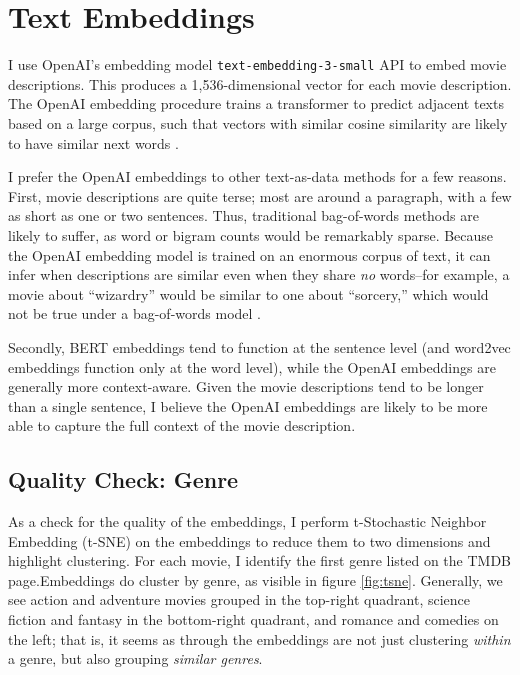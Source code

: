 \documentclass{article}
\begin{document}
\section{Text Embeddings}

I use OpenAI's embedding model \texttt{text-embedding-3-small} API to embed movie descriptions. This produces a 1,536-dimensional vector for each movie description. The OpenAI embedding procedure trains a transformer to predict adjacent texts based on a large corpus, such that vectors with similar cosine similarity are likely to have similar next words \parencite{neelakantan2022ao, kusupati2022ao}.

I prefer the OpenAI embeddings to other text-as-data methods for a few reasons. First, movie descriptions are quite terse; most are around a paragraph, with a few as short as one or two sentences. Thus, traditional bag-of-words methods are likely to suffer, as word or bigram counts would be remarkably sparse. Because the OpenAI embedding model is trained on an enormous corpus of text, it can infer when descriptions are similar even when they share \emph{no} words--for example, a movie about ``wizardry'' would be similar to one about ``sorcery,'' which would not be true under a bag-of-words model \parencite{brown2020a}.

Secondly, BERT embeddings tend to function at the sentence level (and word2vec embeddings function only at the word level), while the OpenAI embeddings are generally more context-aware. Given the movie descriptions tend to be longer than a single sentence, I believe the OpenAI embeddings are likely to be more able to capture the full context of the movie description.


\subsection{Quality Check: Genre}

As a check for the quality of the embeddings, I perform t-Stochastic Neighbor Embedding (t-SNE) on the embeddings to reduce them to two dimensions and highlight clustering. For each movie, I identify the first genre listed on the TMDB page.Embeddings do cluster by genre, as visible in figure \ref{fig:tsne}. Generally, we see action and adventure movies grouped in the top-right quadrant, science fiction and fantasy in the bottom-right quadrant, and romance and comedies on the left; that is, it seems as through the embeddings are not just clustering \emph{within} a genre, but also grouping \emph{similar genres}. 
\end{document}

